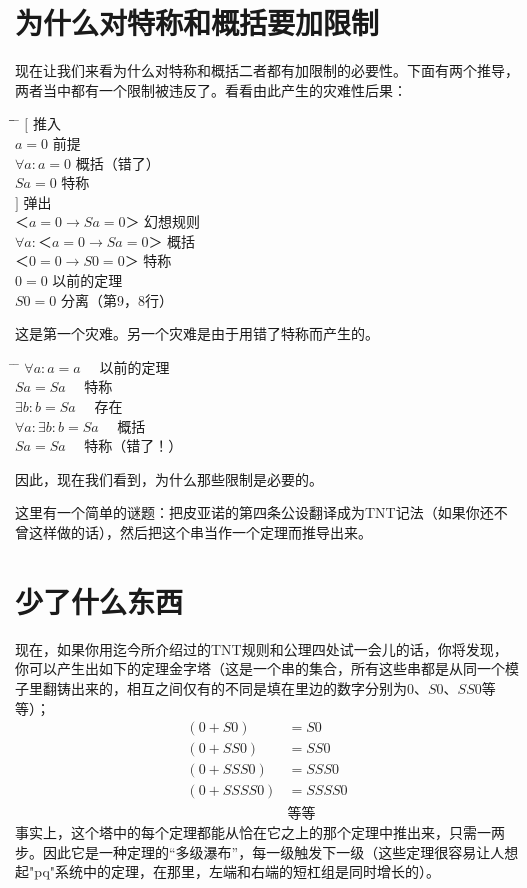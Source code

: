 \section{为什么对特称和概括要加限制}

现在让我们来看为什么对特称和概括二者都有加限制的必要性。下面有两个推导，两者当中都有一个限制被违反了。看看由此产生的灾难性后果：

\begin{tabbing*}
\qquad\qquad \= \quad \= \tabindent{-2em} \= \+\kill
$[$ \>                     \>推入\+\\
  $a=0$                    \>前提\\
  $\forall a:a=0$          \>概括（错了）\\
  $Sa=0$                   \>特称\-\\
$]$ \>                     \>弹出\\
$＜a=0→Sa=0＞$ \>           \>幻想规则\\
$\forall a:＜a=0→Sa=0＞$ \> \>概括\\
$＜0=0→S0=0＞$ \>           \>特称\\
$0=0$ \>                   \>以前的定理\\
$S0=0$ \>                  \>分离（第9，8行）
\end{tabbing*}

这是第一个灾难。另一个灾难是由于用错了特称而产生的。

\begin{tabbing*}
\qquad\qquad \= \tabindent{-2em} \= \+\kill
$\forall a:a=a$             \>　以前的定理\\
$Sa=Sa$                     \>　特称\\
$\exists b:b=Sa$            \>　存在\\
$\forall a:\exists b:b=Sa$  \>　概括\\
$Sa=Sa$ \>　特称（错了！）
\end{tabbing*}
因此，现在我们看到，为什么那些限制是必要的。

这里有一个简单的谜题：把皮亚诺的第四条公设翻译成为TNT记法（如果你还不曾这样做的话），然后把这个串当作一个定理而推导出来。

\section{少了什么东西}

现在，如果你用迄今所介绍过的TNT规则和公理四处试一会儿的话，你将发现，你可以产生出如下的定理金字塔（这是一个串的集合，所有这些串都是从同一个模子里翻铸出来的，相互之间仅有的不同是填在里边的数字分别为$0$、$S0$、$SS0$等等）；
\begin{align*}
(0+S0)    & = S0 \\
(0+SS0)   & = SS0 \\
(0+SSS0)  & = SSS0 \\
(0+SSSS0) & = SSSS0 \\
          & \text{等等}
\end{align*}
事实上，这个塔中的每个定理都能从恰在它之上的那个定理中推出来，只需一两步。因此它是一种定理的“多级瀑布”，每一级触发下一级（这些定理很容易让人想起"pq"系统中的定理，在那里，左端和右端的短杠组是同时增长的）。

